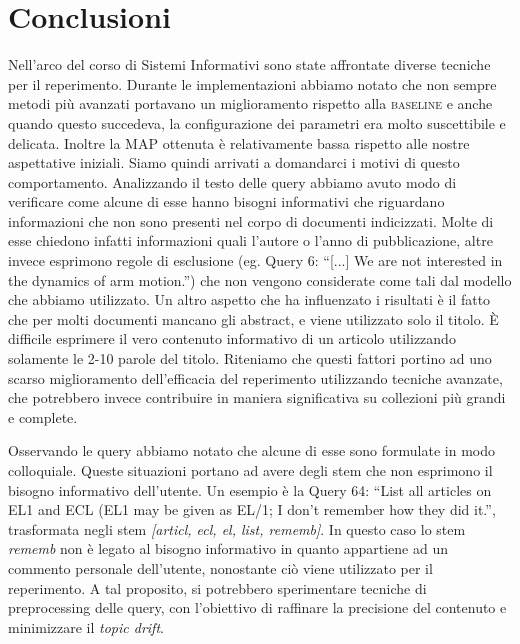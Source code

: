 \documentclass{llncs}
\begin{document}






\section{Conclusioni}
\label{sec:conclusioni}
Nell'arco del corso di Sistemi Informativi sono state affrontate diverse tecniche per il reperimento. Durante le implementazioni abbiamo notato che non sempre metodi pi\`u avanzati portavano un miglioramento rispetto alla \textsc{baseline} e anche quando questo succedeva, la configurazione dei parametri era molto suscettibile e delicata. Inoltre la MAP ottenuta \`e relativamente bassa rispetto alle nostre aspettative iniziali. Siamo quindi arrivati a domandarci i motivi di questo comportamento. Analizzando il testo delle query abbiamo avuto modo di verificare come alcune di esse hanno bisogni informativi che riguardano informazioni che non sono presenti nel corpo di documenti indicizzati. Molte di esse chiedono infatti informazioni quali l'autore o l'anno di pubblicazione, altre invece esprimono regole di esclusione (eg. Query 6: ``[...] We are not interested in the dynamics of arm motion.'') che non vengono considerate come tali dal modello che abbiamo utilizzato. Un altro aspetto che ha influenzato i risultati \`e il fatto che per molti documenti mancano gli abstract, e viene utilizzato solo il titolo. \`E difficile esprimere il vero contenuto informativo di un articolo utilizzando solamente le 2-10 parole del titolo. Riteniamo che questi fattori portino ad uno scarso miglioramento dell'efficacia del reperimento utilizzando tecniche avanzate, che potrebbero invece contribuire in maniera significativa su collezioni pi\`u grandi e complete. 

Osservando le query abbiamo notato che alcune di esse sono formulate in modo colloquiale. Queste situazioni portano ad avere degli stem che non esprimono il bisogno informativo dell'utente. Un esempio \`e la Query 64: ``List all articles on EL1 and ECL (EL1 may be given as EL/1; I don't remember how they did it.'', trasformata negli stem \textit{[articl, ecl, el, list, rememb]}. In questo caso lo stem \textit{rememb} non \`e legato al bisogno informativo in quanto appartiene ad un commento personale dell'utente, nonostante ci\`o viene utilizzato per il reperimento. A tal proposito, si potrebbero sperimentare tecniche di preprocessing delle query, con l'obiettivo di raffinare la precisione del contenuto e minimizzare il \textit{topic drift}.
\end{document}
